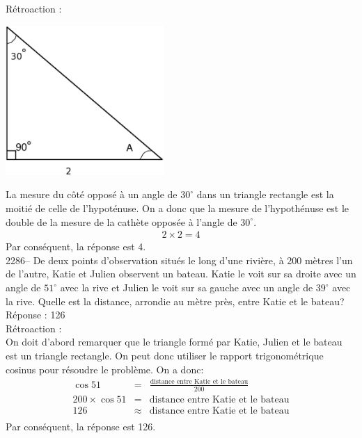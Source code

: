 \documentclass[letterpaper, 12pt]{article}
\begin{document}
R\'etroaction :\\
\begin{center}
 \includegraphics[width=6cm,bb=14 14 569 522]{Triangle_rectangle2285.eps}
\end{center}
La mesure du c\^ot\'e oppos\'e \`a un angle de $30^{\circ}$ dans un triangle rectangle est la moiti\'e de celle de l'hypot\'enuse. On a donc que la mesure de l'hypoth\'enuse est le double de la mesure de la cath\`ete oppos\'ee \`a l'angle de $30^{\circ}$.
\begin{eqnarray*}
2\times2=4
\end{eqnarray*}
Par cons\'equent, la r\'eponse est 4.\\

2286-- De deux points d'observation situ\'es le long d'une rivi\`ere, \`a 200 m\`etres l'un de l'autre, Katie et Julien observent un bateau. Katie le voit sur sa droite avec un angle de $51^{\circ}$ avec la rive et Julien le voit sur sa gauche avec un angle de $39^{\circ}$ avec la rive. Quelle est la distance, arrondie au m\`etre pr\`es, entre Katie et le bateau?\\

R\'eponse : 126\\

R\'etroaction :\\
On doit d'abord remarquer que le triangle form\'e par Katie, Julien et le bateau est un triangle rectangle. On peut donc utiliser le rapport trigonom\'etrique cosinus pour r\'esoudre le probl\`eme. On a donc:
\begin{eqnarray*}
\cos{51}&=&\frac{\textrm{distance entre Katie et le bateau}}{200}\\[2mm]
200\times\cos{51}&=&\textrm{distance entre Katie et le bateau}\\[2mm]
126&\approx&\textrm{distance entre Katie et le bateau}\\
\end{eqnarray*}
Par cons\'equent, la r\'eponse est 126.\\
\end{document}
